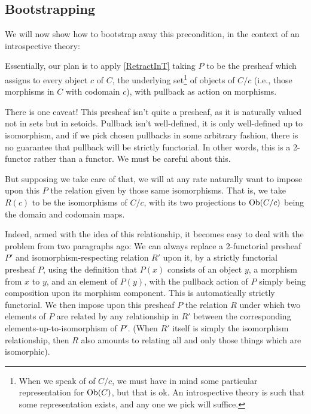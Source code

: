 \subsection{Bootstrapping}
We will now show how to bootstrap away this precondition, in the context of an introspective theory:

Essentially, our plan is to apply \cref{RetractInT} taking $P$ to be the presheaf which assigns to every object $c$ of $C$, the underlying set\footnote{When we speak of  of $C/c$, we must have in mind some particular representation for $\operatorname{Ob}(C)$, but that is ok. An introspective theory is such that some representation exists, and any one we pick will suffice.} of objects of $C/c$ (i.e., those morphisms in $C$ with codomain $c$), with pullback as action on morphisms.

There is one caveat! This presheaf isn't quite a presheaf, as it is naturally valued not in sets but in setoids. Pullback isn't well-defined, it is only well-defined up to isomorphism, and if we pick chosen pullbacks in some arbitrary fashion, there is no guarantee that pullback will be strictly functorial. In other words, this is a 2-functor rather than a functor. We must be careful about this.

But supposing we take care of that, we will at any rate naturally want to impose upon this $P$ the relation given by those same isomorphisms. That is, we take $R(c)$ to be the isomorphisms of $C/c$, with its two projections to $\operatorname{Ob}(C/c)$ being the domain and codomain maps.

Indeed, armed with the idea of this relationship, it becomes easy to deal with the problem from two paragraphs ago: We can always replace a 2-functorial presheaf $P'$ and isomorphism-respecting relation $R'$ upon it, by a strictly functorial presheaf $P$, using the definition that $P(x)$ consists of an object $y$, a morphism from $x$ to $y$, and an element of $P(y)$, with the pullback action of $P$ simply being composition upon its morphism component. This is automatically strictly functorial. We then impose upon this presheaf $P$ the relation $R$ under which two elements of $P$ are related by any relationship in $R'$ between the corresponding elements-up-to-isomorphism of $P'$. (When $R'$ itself is simply the isomorphism relationship, then $R$ also amounts to relating all and only those things which are isomorphic). 


